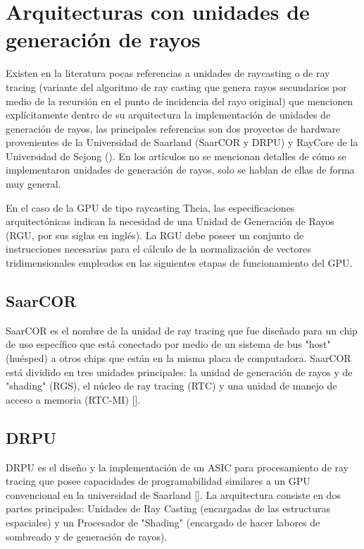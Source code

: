 \section{Arquitecturas con unidades de generación de rayos}

Existen en la literatura pocas referencias a unidades de raycasting o de ray tracing (variante del algoritmo de ray casting que genera rayos secundarios por medio de la recursión en el punto de incidencia del rayo original) que mencionen explícitamente dentro de su arquitectura la implementación de unidades de generación de rayos, las principales referencias son dos proyectos de hardware provenientes de la Universidad de Saarland (SaarCOR y DRPU) y RayCore de la Universidad de Sejong (\cite{Nah2014}).  En los artículos no se mencionan detalles de cómo se implementaron unidades de generación de rayos, solo se hablan de ellas de forma muy general.

En el caso de la GPU de tipo raycasting Theia, las especificaciones arquitectónicas indican la necesidad de una Unidad de Generación de Rayos (RGU, por sus siglas en inglés). La RGU debe poseer un conjunto de instrucciones necesarias para el cálculo de la normalización de vectores tridimensionales empleados en las siguientes etapas de funcionamiento del GPU.

\subsection{SaarCOR}

SaarCOR es el nombre de la unidad de ray tracing que fue diseñado para un chip de uso específico que está conectado por medio de un sistema de bus "host" (huésped) a otros chips que están en la misma placa de computadora. SaarCOR está dividido en tres unidades principales: la unidad de generación de rayos y de "shading" (RGS), el núcleo de ray tracing (RTC) y una unidad de manejo de acceso a memoria (RTC-MI) [\cite{Schmittler2004}]. 

\subsection{DRPU}

DRPU es el diseño y la implementación de un ASIC para procesamiento de ray tracing que posee capacidades de programabilidad similares a un GPU convencional en la universidad de Saarland [\cite{Woop2006}]. La arquitectura consiste en dos partes principales: Unidades de Ray Casting (encargadas de las estructuras espaciales) y un Procesador de "Shading" (encargado de hacer labores de sombreado y de generación de rayos).  

